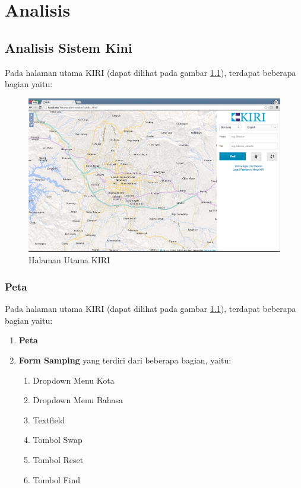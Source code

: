 \chapter{Analisis}
\label{chap:analisis}

\section{Analisis Sistem Kini}
\label{sec:analisiskini}
Pada halaman utama KIRI (dapat dilihat pada gambar \ref{fig:3_KIRI_main}), terdapat beberapa bagian yaitu:

\begin{figure}[H]
	\centering
	\includegraphics[scale=0.3]{Gambar/KIRI-main}
	\caption{Halaman Utama KIRI} 
	\label{fig:3_KIRI_main}
\end{figure}

\subsection{Peta}
Pada halaman utama KIRI (dapat dilihat pada gambar \ref{fig:3_KIRI_main}), terdapat beberapa bagian yaitu:
    \begin{enumerate}
    		\item \textbf{Peta}
    		\item \textbf{Form Samping} yang terdiri dari beberapa bagian, yaitu:
    		\begin{enumerate}
    			\item Dropdown Menu Kota
    			\item Dropdown Menu Bahasa
    			\item Textfield
    			\item Tombol Swap
    			\item Tombol Reset
    			\item Tombol Find
    		\end{enumerate}
    \end{enumerate}

